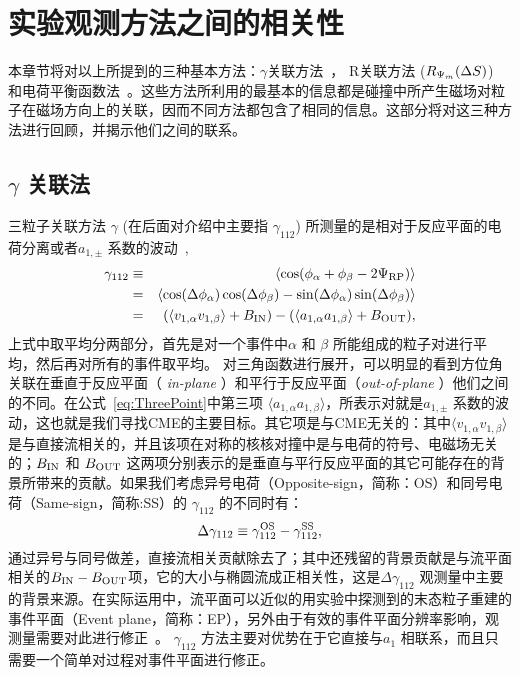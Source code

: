 \section{实验观测方法之间的相关性}
\label{Sec.II}
本章节将对以上所提到的三种基本方法：$\gamma$关联方法~\cite{Voloshin:2008dg}， R关联方法 ($R_{{\rm \Psi}_m}(\Delta S)$)~\cite{RCorr-2011,RCorr-2018} 和电荷平衡函数法~\cite{Tang2019,Lin2021}。这些方法所利用的最基本的信息都是碰撞中所产生磁场对粒子在磁场方向上的关联，因而不同方法都包含了相同的信息。这部分将对这三种方法进行回顾，并揭示他们之间的联系。


\subsection{$\gamma$ 关联法}
\label{sec.gamma}

三粒子关联方法 $\gamma$ (在后面对介绍中主要指 $\gamma_{112}$) 所测量的是相对于反应平面的电荷分离或者$a_{1,\pm}$ 系数的波动~\cite{Voloshin:2008dg},
\begin{eqnarray}
\gamma_{112} &\equiv&  \langle \cos(\phi_\alpha + \phi_\beta -2{\rm \Psi_{RP}}) \rangle \nonumber \\
&=& \langle\cos(\Delta\phi_{\alpha})\cos(\Delta\phi_{\beta}) -
\sin(\Delta\phi_{\alpha})\sin(\Delta\phi_{\beta})\rangle \nonumber \\
&=& (\langle v_{1,\alpha}v_{1,\beta}\rangle + B_{\rm IN}) -(\langle a_{1,\alpha}a_{1,\beta}\rangle + B_{\rm OUT}), \label{eq:ThreePoint}
\end{eqnarray}
\noindent 上式中取平均分两部分，首先是对一个事件中$\alpha$ 和 $\beta$ 所能组成的粒子对进行平均，然后再对所有的事件取平均。
对三角函数进行展开，可以明显的看到方位角关联在垂直于反应平面（ {\it in-plane} ）和平行于反应平面（{\it out-of-plane} ）他们之间的不同。在公式~\ref{eq:ThreePoint}中第三项 $\langle a_{1,\alpha}a_{1,\beta}\rangle$，所表示对就是$a_{1,\pm}$ 系数的波动，这也就是我们寻找CME的主要目标。其它项是与CME无关的：其中$\langle v_{1,\alpha}v_{1,\beta}\rangle$ 是与直接流相关的，并且该项在对称的核核对撞中是与电荷的符号、电磁场无关的；$B_{\rm IN}$ 和 $B_{\rm OUT}$ 这两项分别表示的是垂直与平行反应平面的其它可能存在的背景所带来的贡献。如果我们考虑异号电荷（Opposite-sign，简称：OS）和同号电荷（Same-sign，简称:SS）的 $\gamma_{112}$ 的不同时有：
\begin{equation}
\Delta \gamma_{112} \equiv \gamma^{\rm OS}_{112} - \gamma^{\rm SS}_{112}, 
\end{equation}
\noindent 通过异号与同号做差，直接流相关贡献除去了；其中还残留的背景贡献是与流平面相关的$B_{\rm IN}-B_{\rm OUT}$项，它的大小与椭圆流成正相关性，这是$\Delta \gamma_{112}$ 观测量中主要的背景来源。在实际运用中，流平面可以近似的用实验中探测到的末态粒子重建的事件平面（Event plane，简称：EP），另外由于有效的事件平面分辨率影响，观测量需要对此进行修正~\cite{Poskanzer:1998yz}。
$\gamma_{112}$ 方法主要对优势在于它直接与$a_1$ 相联系，而且只需要一个简单对过程对事件平面进行修正。

